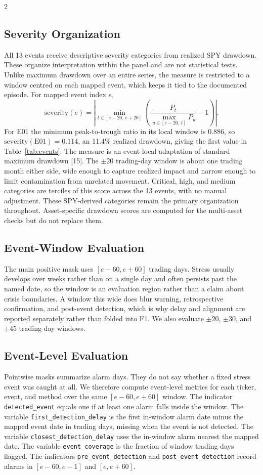 \documentclass{book}
\begin{document}
\begin{multicols}{2}
\subsection{Severity Organization}
All 13 events receive descriptive severity categories from realized SPY drawdown. These organize interpretation within the panel and are not statistical tests. Unlike maximum drawdown over an entire series, the measure is restricted to a window centred on each mapped event, which keeps it tied to the documented episode. For mapped event index $e$,
\begin{equation}
\mathrm{severity}(e)=\left|\min_{t\in[e-20,\,e+20]}\left(\frac{P_t}{\max_{u\in[e-20,\,t]}P_u}-1\right)\right|.
\end{equation}
For E01 the minimum peak-to-trough ratio in its local window is $0.886$, so $\mathrm{severity}(\mathrm{E01})=0.114$, an 11.4\% realized drawdown, giving the first value in Table~\ref{tab:events}. The measure is an event-local adaptation of standard maximum drawdown [15]. The $\pm20$ trading-day window is about one trading month either side, wide enough to capture realized impact and narrow enough to limit contamination from unrelated movement. Critical, high, and medium categories are terciles of this score across the 13 events, with no manual adjustment. These SPY-derived categories remain the primary organization throughout. Asset-specific drawdown scores are computed for the multi-asset checks but do not replace them.

\subsection{Event-Window Evaluation}
The main positive mask uses $[e-60,e+60]$ trading days. Stress usually develops over weeks rather than on a single day and often persists past the named date, so the window is an evaluation region rather than a claim about crisis boundaries. A window this wide does blur warning, retrospective confirmation, and post-event detection, which is why delay and alignment are reported separately rather than folded into F1. We also evaluate $\pm20$, $\pm30$, and $\pm45$ trading-day windows.

\subsection{Event-Level Evaluation}
Pointwise masks summarize alarm days. They do not say whether a fixed stress event was caught at all. We therefore compute event-level metrics for each ticker, event, and method over the same $[e-60,e+60]$ window. The indicator \texttt{detected\_event} equals one if at least one alarm falls inside the window. The variable \texttt{first\_detection\_delay} is the first in-window alarm date minus the mapped event date in trading days, missing when the event is not detected. The variable \texttt{closest\_detection\_delay} uses the in-window alarm nearest the mapped date. The variable \texttt{event\_coverage} is the fraction of window trading days flagged. The indicators \texttt{pre\_event\_detection} and \texttt{post\_event\_detection} record alarms in $[e-60,e-1]$ and $[e,e+60]$.


\end{multicols}
\end{document}
